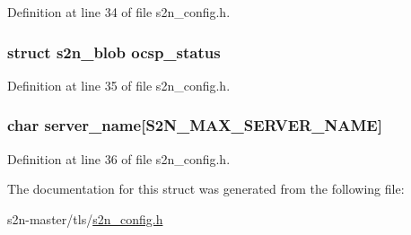 Definition at line 34 of file s2n\+\_\+config.\+h.

\subsubsection[{\texorpdfstring{ocsp\+\_\+status}{ocsp_status}}]{\setlength{\rightskip}{0pt plus 5cm}struct {\bf s2n\+\_\+blob} ocsp\+\_\+status}\hypertarget{structs2n__cert__chain__and__key_a4baf31cc326e006017c66fe41b4194d6}{}\label{structs2n__cert__chain__and__key_a4baf31cc326e006017c66fe41b4194d6}


Definition at line 35 of file s2n\+\_\+config.\+h.

\subsubsection[{\texorpdfstring{server\+\_\+name}{server_name}}]{\setlength{\rightskip}{0pt plus 5cm}char server\+\_\+name\mbox{[}{\bf S2\+N\+\_\+\+M\+A\+X\+\_\+\+S\+E\+R\+V\+E\+R\+\_\+\+N\+A\+ME}\mbox{]}}\hypertarget{structs2n__cert__chain__and__key_a4ab39d5bc6a649110722ddcde959aeb9}{}\label{structs2n__cert__chain__and__key_a4ab39d5bc6a649110722ddcde959aeb9}


Definition at line 36 of file s2n\+\_\+config.\+h.



The documentation for this struct was generated from the following file\+:\begin{DoxyCompactItemize}
\item 
s2n-\/master/tls/\hyperlink{s2n__config_8h}{s2n\+\_\+config.\+h}\end{DoxyCompactItemize}
